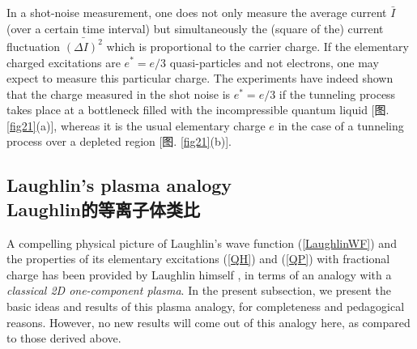 \documentclass[10pt]{book}
\begin{document}
In a shot-noise measurement, one does not only measure the average current $\bar{I}$ (over a certain time interval) but simultaneously
the (square of the) current fluctuation $\bar{(\Delta I)^2}$ which is proportional to the carrier charge.
If the elementary charged excitations are $e^*=e/3$ quasi-particles and not electrons, one
may expect to measure this particular charge. The experiments \cite{SN1,SN2} have indeed shown
that the charge measured in the shot noise is $e^*=e/3$ if the tunneling process takes place at a bottleneck filled with 
the incompressible quantum liquid [图. \ref{fig21}(a)], whereas it is the usual elementary charge $e$ in the case of a
tunneling process over a depleted region [图. \ref{fig21}(b)]. 




\subsection[Laughlin的等离子体类比]{Laughlin's plasma analogy\\\bf Laughlin的等离子体类比}
\label{PlasmaLaugh}

A compelling physical picture of Laughlin's wave function (\ref{LaughlinWF}) and the properties of its elementary
excitations (\ref{QH}) and (\ref{QP}) with fractional charge has been provided by Laughlin himself \cite{laughlin},
in terms of an analogy with a {\sl classical 2D one-component plasma}. In the present subsection, we present the basic
ideas and results of this plasma analogy, for completeness and pedagogical reasons. However, no new results will come 
out of this analogy here, as compared to those derived above.
\end{document}

